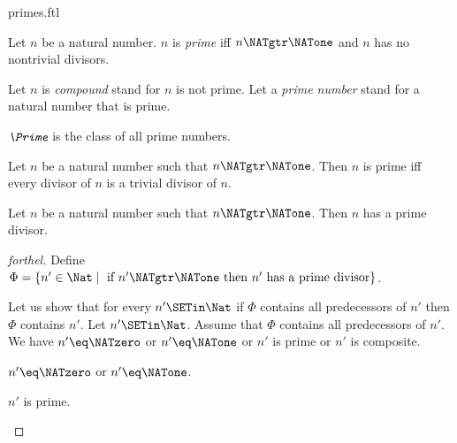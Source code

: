 \documentclass{naproche-library}
\begin{document}
\begin{smodule}[title=Prime Numbers]{primes.ftl}


\begin{definition}[forthel,id=ARITHMETIC_10_5450464558579712]
  Let $n$ be a natural number.
  $n$ is \emph{prime} iff $n \NATgtr \NATone$ and $n$ has no nontrivial divisors.

  Let $n$ is \emph{compound} stand for $n$ is not prime.
  Let a \emph{prime number} stand for a natural number that is prime.
\end{definition}

\begin{definition}[forthel,id=ARITHMETIC_10_3834705971511296]
  $\emph{\Prime}$ is the class of all prime numbers.
\end{definition}

\begin{proposition}[forthel,id=ARITHMETIC_10_7801379464675328]
  Let $n$ be a natural number such that $n \NATgtr \NATone$.
  Then $n$ is prime iff every divisor of $n$ is a trivial divisor of $n$.
\end{proposition}

\begin{proposition}[forthel,id=ARITHMETIC_10_3606185106210816]
  Let $n$ be a natural number such that $n \NATgtr \NATone$.
  Then $n$ has a prime divisor.
\end{proposition}
\begin{proof}[forthel]
  Define $\Phi = \{ n' \in \Nat \mid\text{ if }n' \NATgtr \NATone\text{ then }n'\text{ has a prime divisor}\}$.

  Let us show that for every $n' \SETin \Nat$ if $\Phi$ contains all
  predecessors of $n'$ then $\Phi$ contains $n'$.
    Let $n' \SETin \Nat$.
    Assume that $\Phi$ contains all predecessors of $n'$.
    We have $n' \eq \NATzero$ or $n' \eq \NATone$ or $n'$ is prime or $n'$ is composite.

    \begin{case}{$n' \eq \NATzero$ or $n' \eq \NATone$.} \end{case}

    \begin{case}{$n'$ is prime.} \end{case}


\end{proof}
\end{smodule}
\end{document}
